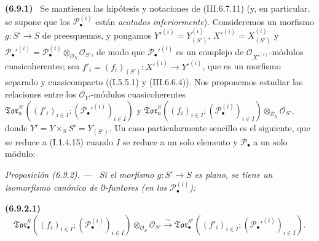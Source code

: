 \documentclass[10pt,oneside]{book}
\newcommand{\sref}[2][]{\textup{(#2)}}
\newenvironment{env}[1][]{\par\medskip\noindent\textbf{(#1)}\ }{\par}
\newenvironment{proposition}[1][]{\par\medskip\noindent\itshape Proposición (#1). ---\ }{\par}
\begin{document}
\begin{env}[6.9.1]
\label{III.6.9.1}
Se mantienen las hipótesis y notaciones de \sref{III.6.7.11} (y, en
particular, se supone que los $\mathscr P_\bullet^{(i)}$ están \emph{acotados
inferiormente}). Consideremos un morfismo $g:S'\to S$ de preesquemas, y
pongamos
$Y'^{(i)}=Y_{(S')}^{(i)}$, $X'^{(i)}=X_{(S')}^{(i)}$ y
$\mathscr P_\bullet'^{(i)}=
\mathscr P_\bullet^{(i)}\otimes_{\mathscr O_S}\mathscr O_{S'}$,
de modo que $\mathscr P_\bullet'^{(i)}$ es un complejo de
$\mathscr O_{X'^{(i)}}$-módulos cuasicoherentes; sea
$f'_i=(f_i)_{(S')}:X'^{(i)}\to Y'^{(i)}$, que es un morfismo separado y
cuasicompacto (\sref[I]{I.5.5.1} y \sref{III.6.6.4}). Nos proponemos
estudiar las relaciones entre los $\mathscr O_{Y'}$-módulos cuasicoherentes
$\mathfrak{Tor}_n^{S'}((f'_i)_{i\in I};
(\mathscr P_\bullet'^{(i)})_{i\in I})$ y
$\mathfrak{Tor}_n^S((f_i)_{i\in I};
(\mathscr P_\bullet^{(i)})_{i\in I})
\otimes_{\mathscr O_S}\mathscr O_{S'}$, donde
$Y'=Y\times_S S'=Y_{(S')}$. Un caso particularmente sencillo es el
siguiente, que se reduce a \sref[I]{I.1.4.15} cuando $I$ se reduce a un solo
elemento y $\mathscr P_\bullet$ a un solo módulo:
\end{env}

\begin{proposition}[6.9.2]
\label{III.6.9.2}
Si el morfismo $g:S'\to S$ es plano, se tiene un isomorfismo canónico de
$\partial$-funtores (en los $\mathscr P_\bullet^{(i)}$):
\begin{env}[6.9.2.1]
\label{III.6.9.2.1}
\[
  \mathfrak{Tor}_\bullet^S
  ((f_i)_{i\in I};(\mathscr P_\bullet^{(i)})_{i\in I})
  \otimes_{\mathscr O_S}\mathscr O_{S'}
  \xrightarrow{\sim}
  \mathfrak{Tor}_\bullet^{S'}
  ((f'_i)_{i\in I};(\mathscr P_\bullet'^{(i)})_{i\in I}).
  \tag{6.9.2.1}\label{III.6.9.2.1.eq}
\]
\end{env}
\end{proposition}
\end{document}

